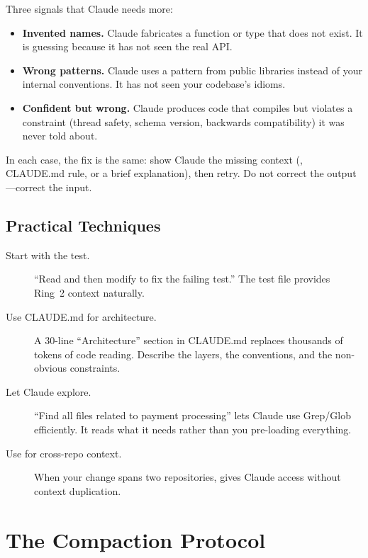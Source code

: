 Three signals that Claude needs more:

\begin{itemize}
  \item \textbf{Invented names.} Claude fabricates a function or
    type that does not exist. It is guessing because it has not
    seen the real API.
  \item \textbf{Wrong patterns.} Claude uses a pattern from public
    libraries instead of your internal conventions. It has not seen
    your codebase's idioms.
  \item \textbf{Confident but wrong.} Claude produces code that
    compiles but violates a constraint (thread safety, schema version,
    backwards compatibility) it was never told about.
\end{itemize}

\noindent In each case, the fix is the same: show Claude the missing
context (, CLAUDE.md rule, or a brief explanation),
then retry. Do not correct the output---correct the input.

\subsection*{Practical Techniques}

\begin{description}
  \item[Start with the test.] ``Read  and then
    modify  to fix the failing test.'' The test file
    provides Ring~2 context naturally.
  \item[Use CLAUDE.md for architecture.] A 30-line ``Architecture''
    section in CLAUDE.md replaces thousands of tokens of code reading.
    Describe the layers, the conventions, and the non-obvious constraints.
  \item[Let Claude explore.] ``Find all files related to payment
    processing'' lets Claude use Grep/Glob efficiently. It reads what
    it needs rather than you pre-loading everything.
  \item[Use  for cross-repo context.] When your change
    spans two repositories, 
    gives Claude access without context duplication.
\end{description}

\section{The Compaction Protocol}
\label{sec:compaction-protocol}

